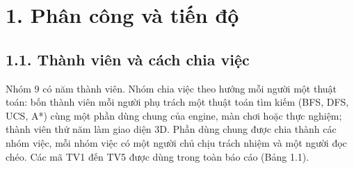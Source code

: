 \section{1. Phân công và tiến độ}

\subsection{1.1. Thành viên và cách chia việc}

Nhóm 9 có năm thành viên. Nhóm chia việc theo hướng mỗi người một thuật toán: bốn thành viên mỗi người phụ trách một thuật toán tìm kiếm (BFS, DFS, UCS, A*) cùng một phần dùng chung của engine, màn chơi hoặc thực nghiệm; thành viên thứ năm làm giao diện 3D. Phần dùng chung được chia thành các nhóm việc, mỗi nhóm việc có một người chủ chịu trách nhiệm và một người đọc chéo. Các mã TV1 đến TV5 được dùng trong toàn báo cáo (Bảng 1.1).


